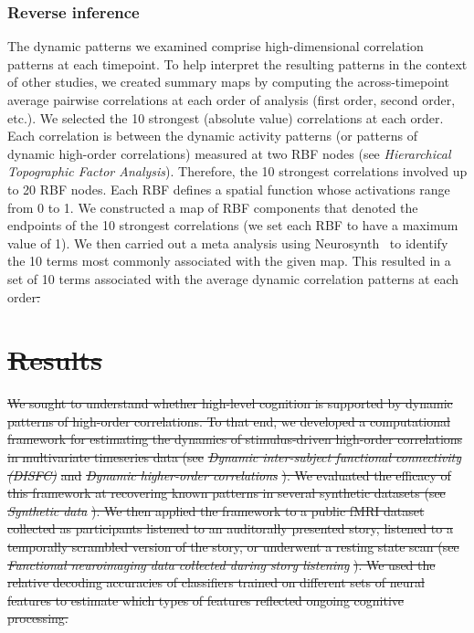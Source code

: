 \documentclass[english]{article}
\providecommand{\DIFdeltex}[1]{{\protect\color{red}\sout{#1}}}                      %
\providecommand{\DIFdelbegin}{} %
\providecommand{\DIFdel}[1]{\texorpdfstring{\DIFdeltex{#1}}{}} %
\newcommand{\DIFscaledelfig}{0.5}
\newlength{\DIFdelgraphicswidth} %
\newlength{\DIFdelgraphicsheight} %
\newcommand{\DIFdelincludegraphics}[2][]{%
\sbox{\DIFdelgraphicsbox}{\DIFOincludegraphics[#1]{#2}}%
\settoboxwidth{\DIFdelgraphicswidth}{\DIFdelgraphicsbox} %
\settoboxtotalheight{\DIFdelgraphicsheight}{\DIFdelgraphicsbox} %
\scalebox{\DIFscaledelfig}{%
\parbox[b]{\DIFdelgraphicswidth}{\usebox{\DIFdelgraphicsbox}\\[-\baselineskip] \rule{\DIFdelgraphicswidth}{0em}}\llap{\resizebox{\DIFdelgraphicswidth}{\DIFdelgraphicsheight}{%
\setlength{\unitlength}{\DIFdelgraphicswidth}%
\begin{picture}(1,1)%
\thicklines\linethickness{2pt} %
{\color[rgb]{1,0,0}\put(0,0){\framebox(1,1){}}}%
{\color[rgb]{1,0,0}\put(0,0){\line( 1,1){1}}}%
{\color[rgb]{1,0,0}\put(0,1){\line(1,-1){1}}}%
\end{picture}%
}\hspace*{3pt}}} %
} %
\DeclareRobustCommand{\DIFdelbegin}{\DIFOdelbegin \let\includegraphics\DIFdelincludegraphics} %
\begin{document}
\subsubsection*{Reverse inference}
The dynamic patterns we examined comprise high-dimensional correlation
patterns at each timepoint.  To help interpret the resulting patterns
in the context of other studies, we created summary maps by computing
the across-timepoint average pairwise correlations at each order of
analysis (first order, second order, etc.).  We selected the 10
strongest (absolute value) correlations at each order.  Each
correlation is between the dynamic activity patterns (or patterns of
dynamic high-order correlations) measured at two RBF nodes (see
\textit{Hierarchical Topographic Factor Analysis}).  Therefore, the 10
strongest correlations involved up to 20 RBF nodes.  Each RBF defines
a spatial function whose activations range from 0 to 1.  We
constructed a map of RBF components that denoted the endpoints of the
10 strongest correlations (we set each RBF to have a maximum value of
1).  We then carried out a meta analysis using
Neurosynth~\citep{RubiEtal17} to identify the 10 terms most commonly
associated with the given map.  This resulted in a set of 10 terms
associated with the average dynamic correlation patterns at each
order\DIFdelbegin \DIFdel{.
}%

\section*{\DIFdel{Results}}
\DIFdel{We sought to understand whether high-level cognition is supported by
dynamic patterns of high-order correlations.  To that end, we
developed a computational framework for estimating the dynamics of
stimulus-driven high-order correlations in multivariate timeseries
data (see }\textit{\DIFdel{Dynamic inter-subject functional connectivity
  (DISFC)}} %
\DIFdel{and }\textit{\DIFdel{Dynamic higher-order correlations}}%
\DIFdel{).  We
evaluated the efficacy of this framework at recovering known patterns
in several synthetic datasets (see }\textit{\DIFdel{Synthetic data}}%
\DIFdel{).  We then
applied the framework to a public fMRI dataset collected as
participants listened to an auditorally presented story, listened to a
temporally scrambled version of the story, or underwent a resting
state scan (see }\textit{\DIFdel{Functional neuroimaging data collected during
  story listening}}%
\DIFdel{).  We used the relative decoding accuracies of
classifiers trained on different sets of neural features to estimate
which types of features reflected ongoing cognitive processing.
}%
\end{document}
